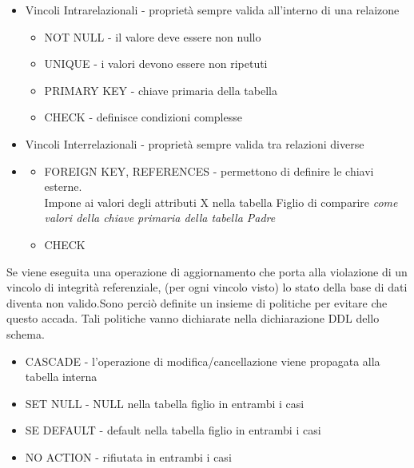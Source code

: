 \documentclass[12pt, a4paper]{article}
\begin{document}
    \begin{itemize}
        \item Vincoli Intrarelazionali - proprietà sempre valida all'interno di una relaizone
        \begin{itemize}
            \item NOT NULL - il valore deve essere non nullo
            \item UNIQUE - i valori devono essere non ripetuti
            \item PRIMARY KEY - chiave primaria della tabella
            \item CHECK - definisce condizioni complesse
        \end{itemize}
        \item Vincoli Interrelazionali - proprietà sempre valida tra relazioni diverse
        \item \begin{itemize}
            \item FOREIGN KEY, REFERENCES - permettono di definire le chiavi esterne.\\
            Impone ai valori degli attributi X nella tabella Figlio di comparire \textit{come valori della chiave primaria della tabella Padre}
            \item CHECK
        \end{itemize}
    \end{itemize}
    Se viene eseguita una operazione di aggiornamento che porta alla
    violazione di un vincolo di integrità referenziale, (per ogni vincolo
    visto) lo stato della base di dati diventa non valido.Sono perciò definite un insieme di politiche per evitare che questo
    accada. Tali politiche vanno dichiarate nella dichiarazione DDL dello
    schema.
    \begin{itemize}
        \item CASCADE - l'operazione di modifica/cancellazione viene propagata alla tabella interna
        \item SET NULL - NULL nella tabella figlio in entrambi i casi
        \item SE DEFAULT - default nella tabella figlio in entrambi i casi
        \item NO ACTION - rifiutata in entrambi i casi
    \end{itemize}

    \newpage
\end{document}
